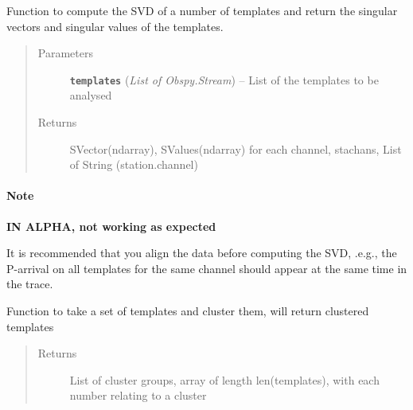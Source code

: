 \documentclass[a4paper,10pt,english]{sphinxmanual}
\begin{document}
\begin{fulllineitems}
\label{modules:clustering.SVD_tetsing}
Function to compute the SVD of a number of templates and return the singular
vectors and singular values of the templates.
\begin{quote}\begin{description}
\item[{Parameters}] \leavevmode
\textbf{\texttt{templates}} (\emph{List of Obspy.Stream}) -- List of the templates to be analysed

\item[{Returns}] \leavevmode
SVector(ndarray), SValues(ndarray) for each channel, stachans, List
of String (station.channel)

\end{description}\end{quote}
\paragraph{Note}

\textbf{IN ALPHA, not working as expected}

It is recommended that you align the data before computing the SVD, .e.g.,
the P-arrival on all templates for the same channel should appear at the same
time in the trace.

\end{fulllineitems}


\begin{fulllineitems}
\label{modules:clustering.cluster}
Function to take a set of templates and cluster them, will return clustered
templates
\begin{quote}\begin{description}
\item[{Returns}] \leavevmode
List of cluster groups, array of length len(templates), with
each number relating to a cluster

\end{description}\end{quote}

\end{fulllineitems}

\end{document}
